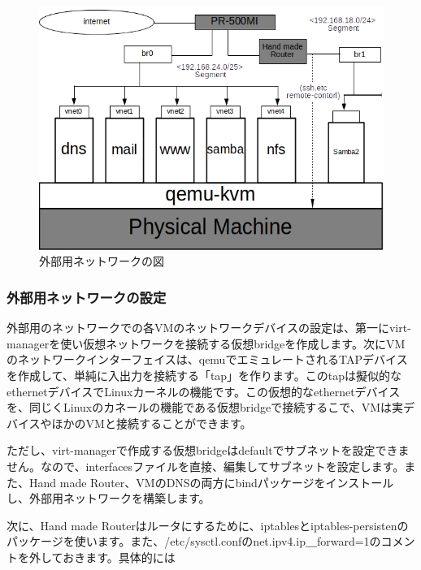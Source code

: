 \documentclass[mingoth,a4paper]{jsarticle}
\begin{document}
\begin{figure}[!h]
\centering
\includegraphics{image201803-kansai/external.png}
\caption{外部用ネットワークの図}
\end{figure}
\clearpage

\subsubsection{外部用ネットワークの設定}
外部用のネットワークでの各VMのネットワークデバイスの設定は、第一にvirt-managerを使い仮想ネットワークを接続する仮想bridgeを作成します。次にVMのネットワークインターフェイスは、qemuでエミュレートされるTAPデバイスを作成して、単純に入出力を接続する「tap」を作ります。このtapは擬似的なethernetデバイスでLinuxカーネルの機能です。この仮想的なethernetデバイスを、同じくLinuxのカネールの機能である仮想bridgeで接続するこで、VMは実デバイスやほかのVMと接続することができます。

ただし、virt-managerで作成する仮想bridgeはdefaultでサブネットを設定できません。なので、interfacesファイルを直接、編集してサブネットを設定します。また、Hand made Router、VMのDNSの両方にbindパッケージをインストールし、外部用ネットワークを構築します。

次に、Hand made Routerはルータにするために、iptablesとiptables-persistenのパッケージを使います。また、/etc/sysctl.confのnet.ipv4.ip＿forward=1のコメントを外しておきます。具体的には
\end{document}
